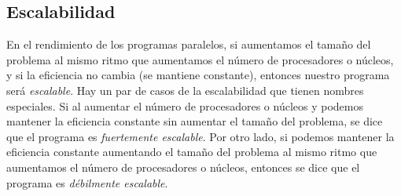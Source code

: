 \subsection{Escalabilidad}
\label{section:esca}

En el rendimiento de los programas paralelos, si aumentamos el tamaño del problema al mismo ritmo que aumentamos el número de procesadores o núcleos, y si la eficiencia no cambia (se mantiene constante), entonces nuestro programa será \emph{escalable}.
Hay un par de casos de la escalabilidad que tienen nombres especiales. Si al aumentar el número de procesadores o núcleos y podemos mantener la eficiencia constante sin aumentar el tamaño del problema, se dice que el programa es \emph{fuertemente escalable}. Por otro lado, si podemos mantener la eficiencia constante aumentando el tamaño del problema al mismo ritmo que aumentamos el número de procesadores o núcleos, entonces se dice que el programa es \emph{débilmente escalable}. \cite{pacheco2011introduction}